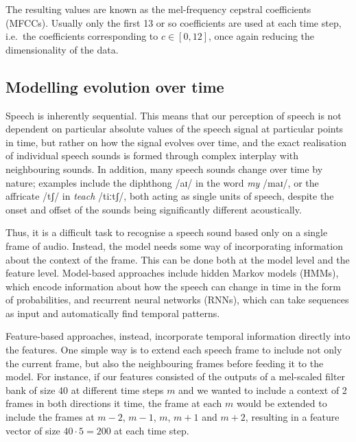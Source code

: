 The resulting values are known as the mel-frequency cepstral coefficients (MFCCs).
Usually only the first 13 or so coefficients are used at each time step, i.e.\ the coefficients corresponding to $c \in [0, 12]$, once again reducing the dimensionality of the data.

\subsection{Modelling evolution over time}

Speech is inherently sequential.
This means that our perception of speech is not dependent on particular absolute values of the speech signal at particular points in time, but rather on how the signal evolves over time, and the exact realisation of individual speech sounds is formed through complex interplay with neighbouring sounds.
In addition, many speech sounds change over time by nature; examples include the diphthong /aɪ/ in the word \emph{my} /maɪ/, or the affricate /tʃ/ in \emph{teach} /tiːtʃ/, both acting as single units of speech, despite the onset and offset of the sounds being significantly different acoustically.

Thus, it is a difficult task to recognise a speech sound based only on a single frame of audio.
Instead, the model needs some way of incorporating information about the context of the frame.
This can be done both at the model level and the feature level.
Model-based approaches include hidden Markov models (HMMs), which encode information about how the speech can change in time in the form of probabilities, and recurrent neural networks (RNNs), which can take sequences as input and automatically find temporal patterns.

Feature-based approaches, instead, incorporate temporal information directly into the features.
One simple way is to extend each speech frame to include not only the current frame, but also the neighbouring frames before feeding it to the model.
For instance, if our features consisted of the outputs of a mel-scaled filter bank of size 40 at different time steps $m$ and we wanted to include a context of 2 frames in both directions it time, the frame at each $m$ would be extended to include the frames at $m-2$, $m-1$, $m$, $m+1$ and $m+2$, resulting in a feature vector of size $40\cdot5 = 200$ at each time step.


